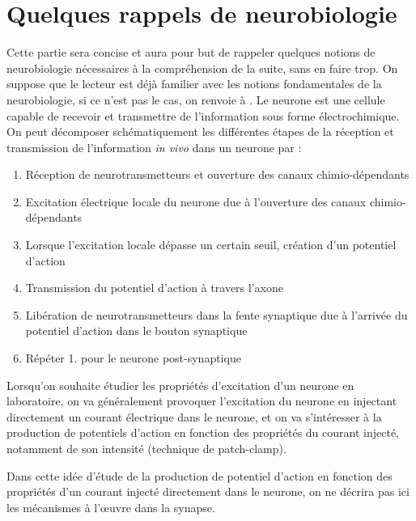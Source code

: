 \documentclass[12pt]{scrartcl}
\begin{document}
\section{Quelques rappels de neurobiologie} \label{rappelneuro1}
Cette partie sera concise et aura pour but de rappeler quelques notions de neurobiologie nécessaires à la compréhension de la suite, sans en faire trop. On suppose que le lecteur est déjà familier avec les notions fondamentales de la neurobiologie, si ce n'est pas le cas, on renvoie à \cite{kandel2000principles}. 
Le neurone est une cellule capable de recevoir et transmettre de l'information sous forme électrochimique. On peut décomposer schématiquement les différentes étapes de la réception et transmission de l'information \textit{in vivo} dans un neurone par :
\begin{enumerate}
\item Réception de neurotransmetteurs et ouverture des canaux chimio-dépendants
\item Excitation électrique locale du neurone due à l'ouverture des canaux chimio-dépendants
\item Lorsque l'excitation locale dépasse un certain seuil, création d'un potentiel d'action
\item Transmission du potentiel d'action à travers l'axone
\item Libération de neurotransmetteurs dans la fente synaptique due à l'arrivée du potentiel d'action dans le bouton synaptique 
\item Répéter 1. pour le neurone post-synaptique
\end{enumerate}

Lorsqu'on souhaite étudier les propriétés d'excitation d'un neurone en laboratoire, on va généralement provoquer l'excitation du neurone en injectant directement un courant électrique dans le neurone, et on va s'intéresser à la production de potentiels d'action en fonction des propriétés du courant injecté, notamment de son intensité (technique de patch-clamp). 

Dans cette idée d'étude de la production de potentiel d'action en fonction des propriétés d'un courant injecté directement dans le neurone, on ne décrira pas ici les mécanismes à l'œuvre dans la synapse.
\end{document}
